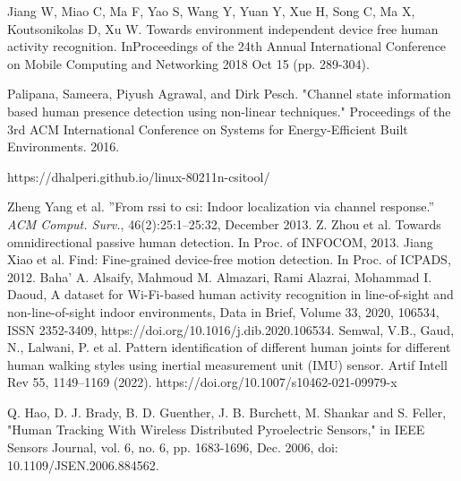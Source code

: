\documentclass[conference]{IEEEtran}
\begin{document}
\begin{thebibliography}{00}

Jiang W, Miao C, Ma F, Yao S, Wang Y, Yuan Y, Xue H, Song C, Ma X, Koutsonikolas D, Xu W. Towards environment independent device free human activity recognition. InProceedings of the 24th Annual International Conference on Mobile Computing and Networking 2018 Oct 15 (pp. 289-304).

Palipana, Sameera, Piyush Agrawal, and Dirk Pesch. "Channel state information based human presence detection using non-linear techniques." Proceedings of the 3rd ACM International Conference on Systems for Energy-Efficient Built Environments. 2016.

 https://dhalperi.github.io/linux-80211n-csitool/

Zheng Yang et al. ''From rssi to csi: Indoor localization via channel response.'' \textit{ACM Comput. Surv.}, 46(2):25:1–25:32, December 2013.
 Z. Zhou et al. Towards omnidirectional passive human detection. In Proc. of INFOCOM, 2013.
 Jiang Xiao et al. Find: Fine-grained device-free motion detection. In Proc. of ICPADS, 2012.
 Baha’ A. Alsaify, Mahmoud M. Almazari, Rami Alazrai, Mohammad I. Daoud,
A dataset for Wi-Fi-based human activity recognition in line-of-sight and non-line-of-sight indoor environments,
Data in Brief,
Volume 33,
2020,
106534,
ISSN 2352-3409,
https://doi.org/10.1016/j.dib.2020.106534.
 Semwal, V.B., Gaud, N., Lalwani, P. et al. Pattern identification of different human joints for different human walking styles using inertial measurement unit (IMU) sensor. Artif Intell Rev 55, 1149–1169 (2022). https://doi.org/10.1007/s10462-021-09979-x

 Q. Hao, D. J. Brady, B. D. Guenther, J. B. Burchett, M. Shankar and S. Feller, "Human Tracking With Wireless Distributed Pyroelectric Sensors," in IEEE Sensors Journal, vol. 6, no. 6, pp. 1683-1696, Dec. 2006, doi: 10.1109/JSEN.2006.884562.


\end{thebibliography}
\end{document}
